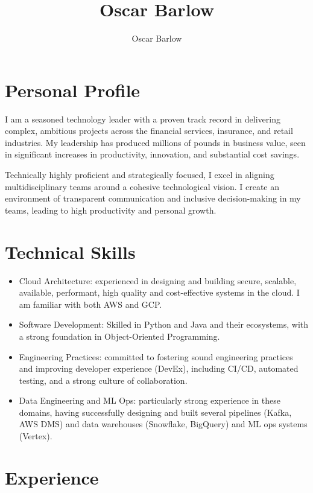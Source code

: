 \documentclass[a4paper]{scrartcl}
\author{Oscar Barlow}
\title{Oscar Barlow}
\date{}
\begin{document}
\maketitle

\section*{Personal Profile}
 { %
  \setlength{\parskip}{6pt plus 2pt minus 1pt}
  I am a seasoned technology leader with a proven track record in
  delivering complex, ambitious projects across the financial services,
  insurance,
  and retail industries. My leadership has produced
  millions of pounds in business value, seen in significant increases in
  productivity, innovation, and substantial cost savings.

  Technically highly proficient and strategically focused, I excel in aligning
  multidisciplinary
  teams around a cohesive technological vision. I create an environment of
  transparent communication and inclusive decision-making in my teams, leading to
  high productivity and personal growth.
 } %

\section*{Technical Skills}
\begin{itemize}
	\item Cloud Architecture: experienced in designing and building secure,
	      scalable, available, performant, high quality and cost-effective
	      systems in the
	      cloud. I am familiar with both AWS and GCP.
	\item Software Development: Skilled in Python and Java and their
	      ecosystems, with a
	      strong foundation in Object-Oriented Programming.
	\item Engineering Practices: committed to fostering sound engineering
	      practices and improving developer experience (DevEx), including
	      CI/CD,
	      automated testing, and a strong culture of collaboration.
	\item Data Engineering and ML Ops: particularly strong experience in
	      these domains, having successfully designing and built several
	      pipelines (Kafka, AWS DMS) and data warehouses (Snowflake,
	      BigQuery)
	      and ML ops systems (Vertex).
\end{itemize}

\section*{Experience}
\end{document}
